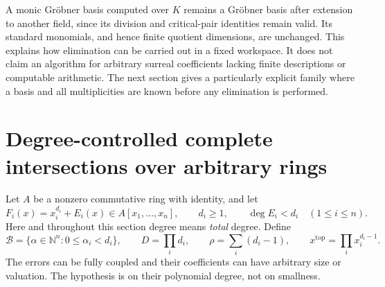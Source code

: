 \documentclass[11pt,letterpaper,oneside]{article}
\numberwithin{equation}{section}
\theoremstyle{definition}
\theoremstyle{remark}\newtheorem{remark}[theorem]{Remark}
\newcommand{\N}{\mathbb N}\newcommand{\Z}{\mathbb Z}
\begin{document}
A monic Gr\"obner basis computed over $K$ remains a Gr\"obner basis after
extension to another field, since its division and critical-pair
identities remain valid. Its standard monomials, and hence finite quotient
dimensions, are unchanged. This explains how elimination can be carried
out in a fixed workspace. It does not claim an algorithm for arbitrary
surreal coefficients lacking finite descriptions or computable arithmetic.
The next section gives a particularly explicit family where a basis and
all multiplicities are known before any elimination is performed.

\section{Degree-controlled complete intersections over arbitrary rings}\label{sec:globalci}
Let $A$ be a nonzero commutative ring with identity, and let
\begin{equation}\label{eq:polysystem}
 F_i(x)=x_i^{d_i}+E_i(x)\in A[x_1,\ldots,x_n],\qquad
 d_i\geq1,\qquad \deg E_i<d_i\quad(1\leq i\leq n).
\end{equation}
Here and throughout this section degree means \emph{total} degree.
Define
\[
 \mathcal B=\{\alpha\in\N^n:0\leq\alpha_i<d_i\},\qquad
 D=\prod_i d_i,\qquad \rho=\sum_i(d_i-1),\qquad
 x^{\mathrm{top}}=\prod_i x_i^{d_i-1}.
\]
The errors can be fully coupled and their coefficients can have arbitrary
size or valuation. The hypothesis is on their polynomial degree, not on
smallness.
\end{document}
